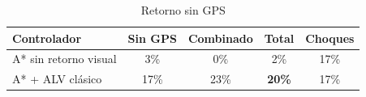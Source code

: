 \begin{table}[t]
\centering
\caption{Retorno sin GPS}
\label{tab:ablacion3}
\begin{tabular}{lcccc}
\toprule
Controlador & Sin GPS & Combinado & Total & Choques \\
\midrule
A* sin retorno visual & 3\% & 0\% & 2\% & 17\% \\
A* + ALV clásico & 17\% & 23\% & \textbf{20\%} & 17\% \\
\bottomrule
\end{tabular}
\end{table}
